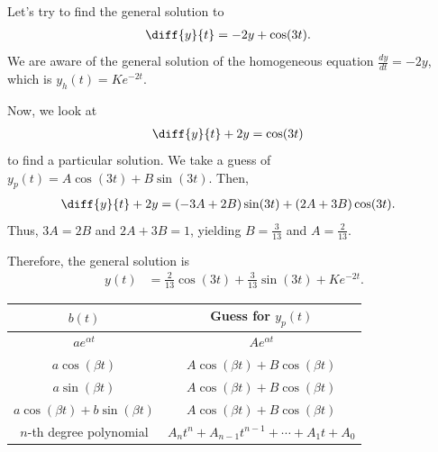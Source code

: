 \documentclass[10pt]{mypackage}
\begin{document}
\begin{example}
  Let's try to find the general solution to 
  \begin{align*}
    \diff{y}{t} &= -2y + \cos(3t).
  \end{align*}
  We are aware of the general solution of the homogeneous equation $\frac{dy}{dt} = -2y$, which is $y_h(t) = Ke^{-2t}$.\newline

  Now, we look at
  \begin{align*}
    \diff{y}{t} + 2y &= \cos(3t)
  \end{align*}
  to find a particular solution. We take a guess of $y_p(t) = A\cos(3t) + B\sin(3t)$. Then,
  \begin{align*}
    \diff{y}{t} + 2y &= \left(-3A + 2B\right)\sin(3t) + \left(2A + 3B\right)\cos(3t).
  \end{align*}
  Thus, $3A = 2B$ and $2A + 3B = 1$, yielding $B = \frac{3}{13}$ and $A = \frac{2}{13}$.\newline

  Therefore, the general solution is
  \begin{align*}
    y(t) &= \frac{2}{13}\cos(3t) + \frac{3}{13}\sin(3t) + Ke^{-2t}.
  \end{align*}
\end{example}
\begin{center}
  \renewcommand{\arraystretch}{1.5}
  \begin{tabular}{c|c}
    $b(t)$ & Guess for $y_p(t)$\\
    \hline
    $ae^{\alpha t}$ & $Ae^{\alpha t}$\\
    $a\cos\left(\beta t\right)$ & $A\cos\left(\beta t\right) + B\cos\left(\beta t\right)$\\
    $a\sin\left(\beta t\right)$ & $A\cos\left(\beta t\right) + B\cos\left(\beta t\right)$\\
    $a\cos\left(\beta t\right) + b\sin\left(\beta t\right)$ & $A\cos\left(\beta t\right) + B\cos\left(\beta t\right)$\\
    $n$-th degree polynomial & $A_nt^{n} + A_{n-1}t^{n-1} + \cdots + A_1t + A_0$
  \end{tabular}
\end{center}
\end{document}
